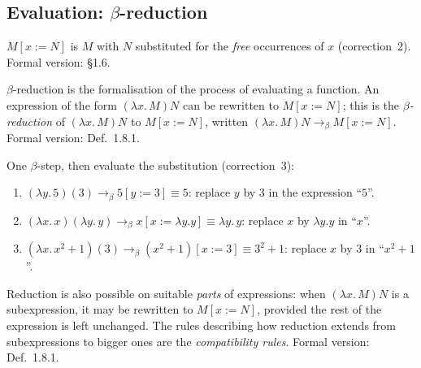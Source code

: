 \documentclass[11pt]{article}
\newcommand{\bred}{\to_\beta}
\begin{document}
\subsection{Evaluation: $\beta$-reduction}

\begin{definition}\label{def:subst-informal}
$M[x := N]$ is $M$ with $N$ substituted for the \emph{free} occurrences of
$x$ (correction~2). Formal version: \S1.6.
\end{definition}

\begin{definition}\label{def:beta-informal}
$\beta$-reduction is the formalisation of the process of evaluating a
function. An expression of the form $(\lambda x.\, M)N$ can be rewritten to
$M[x := N]$; this is the \emph{$\beta$-reduction} of $(\lambda x.\, M)N$ to
$M[x:=N]$, written $(\lambda x.\, M)N \bred M[x:=N]$.
Formal version: Def.~1.8.1.
\end{definition}

\begin{example}\label{ex:beta-informal}
One $\beta$-step, then evaluate the substitution (correction~3):
\begin{enumerate}[label=(\roman*)]
  \item $(\lambda y.\,5)(3) \bred 5[y:=3] \equiv 5$: replace $y$ by $3$ in
        the expression ``$5$''.
  \item $(\lambda x.\,x)(\lambda y.\,y) \bred x[x:=\lambda y.y] \equiv
        \lambda y.\,y$: replace $x$ by $\lambda y.y$ in ``$x$''.
  \item $(\lambda x.\,x^2+1)(3) \bred (x^2+1)[x:=3] \equiv 3^2+1$: replace
        $x$ by $3$ in ``$x^2+1$''.
\end{enumerate}
\end{example}

\begin{remark}\label{rem:compatibility-informal}
Reduction is also possible on suitable \emph{parts} of expressions: when
$(\lambda x.\, M)N$ is a subexpression, it may be rewritten to $M[x:=N]$,
provided the rest of the expression is left unchanged. The rules describing
how reduction extends from subexpressions to bigger ones are the
\emph{compatibility rules}. Formal version: Def.~1.8.1.
\end{remark}
\end{document}
